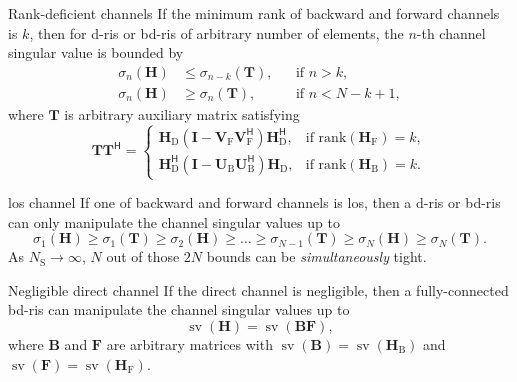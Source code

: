 \documentclass[final,xcolor={table}]{beamer}
\DeclareMathOperator{\sv}{sv}
\newlength{\colwidth}
\begin{document}
\begin{frame}[t]
\begin{columns}[t]
\begin{column}{\colwidth}
			\begin{prop}{Rank-deficient channels}{}
				\setlength{\leftskip}{\leftmargini}
				\setlength{\rightskip}{\leftmargini}
				If the minimum rank of backward and forward channels is $k$,
				then for \gls{d}-\gls{ris} or \gls{bd}-\gls{ris} of arbitrary number of elements, the $n$-th channel singular value is bounded by
				\begin{align*}
					\sigma_n(\mathbf{H}) & \le \sigma_{n-k}(\mathbf{T}), &  & \text{if } n > k, \\
					\sigma_n(\mathbf{H}) & \ge \sigma_n(\mathbf{T}),     &  & \text{if } n < N - k + 1,
				\end{align*}
				where $\mathbf{T}$ is arbitrary auxiliary matrix satisfying
				\begin{equation*}
					\mathbf{T} \mathbf{T}^\mathsf{H} =
					\begin{cases}
						\mathbf{H}_\mathrm{D} (\mathbf{I} - \mathbf{V}_\mathrm{F} \mathbf{V}_\mathrm{F}^\mathsf{H}) \mathbf{H}_\mathrm{D}^\mathsf{H}, & \text{if } \mathrm{rank}(\mathbf{H}_\mathrm{F}) = k, \\
						\mathbf{H}_\mathrm{D}^\mathsf{H} (\mathbf{I} - \mathbf{U}_\mathrm{B} \mathbf{U}_\mathrm{B}^\mathsf{H}) \mathbf{H}_\mathrm{D}, & \text{if } \mathrm{rank}(\mathbf{H}_\mathrm{B}) = k.
					\end{cases}
				\end{equation*}
				\vspace{-0.5cm}
			\end{prop}

			\begin{coro}{\gls{los} channel}{}
				\setlength{\leftskip}{\leftmargini}
				\setlength{\rightskip}{\leftmargini}
				If one of backward and forward channels is \gls{los}, then a \gls{d}-\gls{ris} or \gls{bd}-\gls{ris} can only manipulate the channel singular values up to
				\begin{equation*}
					\sigma_1(\mathbf{H}) \ge \sigma_1(\mathbf{T}) \ge {\sigma_2(\mathbf{H})} \ge \ldots \ge \sigma_{N-1}(\mathbf{T}) \ge {\sigma_N(\mathbf{H})} \ge \sigma_N(\mathbf{T}).
				\end{equation*}
				As $N_\mathrm{S} \to \infty$, $N$ out of those $2N$ bounds can be \emph{simultaneously} tight.
			\end{coro}

			\begin{prop}{Negligible direct channel}{}
				\setlength{\leftskip}{\leftmargini}
				\setlength{\rightskip}{\leftmargini}
				If the direct channel is negligible, then a fully-connected \gls{bd}-\gls{ris} can manipulate the channel singular values up to
				\begin{equation*}
					\sv(\mathbf{H}) = \sv(\mathbf{BF}),
				\end{equation*}
				where $\mathbf{B}$ and $\mathbf{F}$ are arbitrary matrices with $\sv(\mathbf{B})=\sv(\mathbf{H}_\mathrm{B})$ and $\sv(\mathbf{F})=\sv(\mathbf{H}_\mathrm{F})$.
			\end{prop}


\end{column}
\end{columns}
\end{frame}
\end{document}
